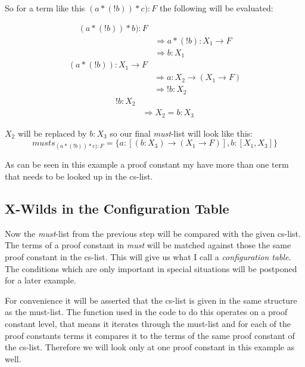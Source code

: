 So for a term like this $(a*(!b))*c):F$ the following will be evaluated:

\begin{equation}\label{musts}
\begin{split}
	(a*(!b))*b):F \\
	& \Rightarrow a*(!b):  X_1 \rightarrow F \\
	& \Rightarrow b:  X_1
\end{split}
\end{equation}
\begin{equation}\label{musts1}
\begin{split}
	(a*(!b)): X_1 \rightarrow F \\
	& \Rightarrow a: X_2 \rightarrow (X_1 \rightarrow F)\\
	& \Rightarrow !b: X_2
\end{split}
\end{equation}
\begin{equation}\label{musts2}
\begin{split}
	!b: X_2 \\
	& \Rightarrow X_2 = b:X_3
\end{split}
\end{equation}

$X_2$ will be replaced by $b:X_3$ so our final \emph{must}-list will look like this: 
\begin{equation}\label{must-list}
musts_{(a*(!b))*c):F} = \{a: [(b:X_3) \rightarrow (X_1 \rightarrow F)], b: [X_1, X_3] \}
\end{equation}

As can be seen in this example a proof constant my have more than one term that needs to be looked up in the cs-list.

\subsection{X-Wilds in the Configuration Table}
Now the \emph{must}-list from the previous step will be compared with the given cs-list. The terms of a proof constant in \emph{must} will be matched against those the same proof constant in the cs-list. This will give us what I call a \emph{configuration table}. The conditions which are only important in special situations will be postponed for a later example.

For convenience it will be asserted that the cs-list is given in the same structure as the must-list. The function used in the code to do this operates on a proof constant level, that means it iterates through the must-list and for each of the proof constants terms it compares it to the terms of the same proof constant of the cs-list. Therefore we will look only at one proof constant in this example as well.

